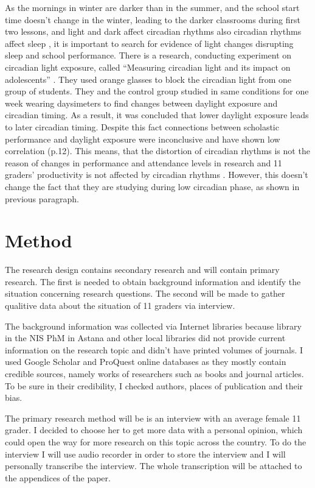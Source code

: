 \documentclass[12pt,a4paper,stu, donotrepeattitle, floatsintext]{apa7}
\begin{document}
As the mornings in winter are darker than in the summer, and the school start time doesn’t change in the winter, leading to the darker classrooms during first two lessons, and  light and dark affect circadian rhythms also circadian rhythms affect sleep \cite{nigms}, it is important to search for evidence of light changes disrupting sleep and school performance. There is a research, conducting experiment on circadian light exposure, called “Measuring circadian light and its impact on adolescents” \cite{Figueiro2011}. They used orange glasses to block the circadian light from one group of students. They and the control group studied in same conditions for one week wearing daysimeters to find changes between daylight exposure and circadian timing. As a result, it was concluded that lower daylight exposure leads to later circadian timing. Despite this fact connections between scholastic performance and daylight exposure were inconclusive and have shown low correlation (p.12). This means, that the distortion of circadian rhythms is not the reason of changes in performance and attendance levels in research and 11 graders’ productivity is not affected by circadian rhythms \cite{Kelley2017, Owens2010}. However, this doesn’t change the fact that they are studying during low circadian phase, as shown in previous paragraph.

\section{Method}
The research design contains secondary research and will contain primary research. The first is needed to obtain background information and identify the situation concerning research questions. The second will be made to gather qualitive data about the situation of 11 graders via interview.

The background information was collected via Internet libraries because library in the NIS PhM in Astana and other local libraries did not provide current information on the research topic and didn’t have printed volumes of journals. I used Google Scholar and ProQuest online databases as they mostly contain credible sources, namely works of researchers such as books and journal articles. To be sure in their credibility, I checked authors, places of publication and their bias.

The primary research method will be is an interview with an average female 11 grader. I decided to choose her to get more data with a personal opinion, which could open the way for more research on this topic across the country. To do the interview I will use audio recorder in order to store the interview and I will personally transcribe the interview. The whole transcription will be attached to the appendices of the paper.
\end{document}
